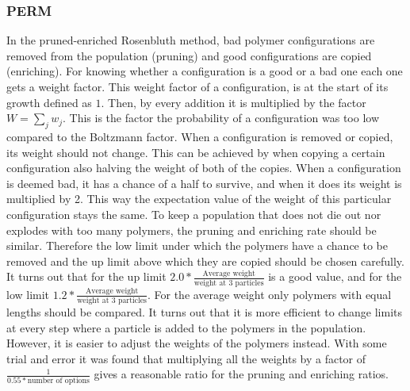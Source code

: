 \documentclass{article}
\begin{document}
\begin{multicols}{2}
\subsubsection*{PERM}
In the pruned-enriched Rosenbluth method, bad polymer configurations are removed from the population (pruning) and good configurations are copied (enriching). For knowing whether a configuration is a good or a bad one each one gets a weight factor. This weight factor of a configuration, is at the start of its growth defined as $1$. Then, by every addition it is multiplied by the factor $W=\sum_{j}w_j$. This is the factor the probability of a configuration was too low compared to the Boltzmann factor. When a configuration is removed or copied, its weight should not change. This can be achieved by when copying a certain configuration also halving the weight of both of the copies. When a configuration is deemed bad, it has a chance of a half to survive, and when it does its weight is multiplied by 2. This way the expectation value of the weight of this particular configuration stays the same. To keep a population that does not die out nor explodes with too many polymers, the pruning and enriching rate should be similar. Therefore the low limit under which the polymers have a chance to be removed and the up limit above which they are copied should be chosen carefully. It turns out that for the up limit $2.0*\frac{\textrm{Average weight}}{\textrm{weight at 3 particles}}$ is a good value, and for the low limit $1.2*\frac{\textrm{Average weight}}{\textrm{weight at 3 particles}}$\cite{Jos}. For the average weight only polymers with equal lengths should be compared. It turns out that it is more efficient to change limits at every step where a particle is added to the polymers in the population. However, it is easier to adjust the weights of the polymers instead. With some trial and error it was found that multiplying all the weights by a factor of $\frac{1}{0.55*\textrm{number of options}}$ gives a reasonable ratio for the pruning and enriching ratios. 


\end{multicols}
\end{document}

